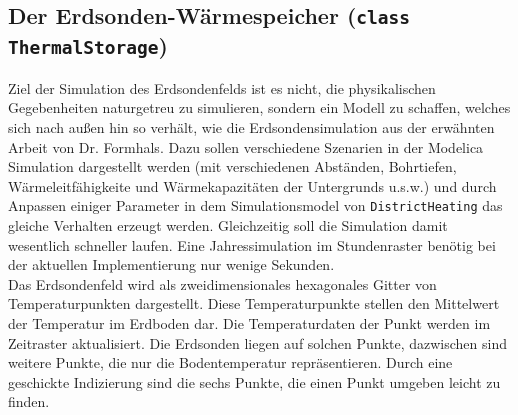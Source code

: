 \documentclass[12pt,a4paper]{article}
\begin{document}
\subsection{Der Erdsonden-Wärmespeicher (\texttt{class ThermalStorage})}
Ziel der Simulation des Erdsondenfelds ist es nicht, die physikalischen Gegebenheiten naturgetreu zu simulieren, sondern ein Modell zu schaffen, welches sich nach außen hin so verhält, wie die Erdsondensimulation aus der erwähnten Arbeit von Dr. Formhals. Dazu sollen verschiedene Szenarien in der Modelica Simulation dargestellt werden (mit verschiedenen Abständen, Bohrtiefen, Wärmeleitfähigkeite und Wärmekapazitäten der Untergrunds u.s.w.) und durch Anpassen einiger Parameter in dem Simulationsmodel von \texttt{DistrictHeating} das gleiche Verhalten erzeugt werden. Gleichzeitig soll die Simulation damit wesentlich schneller laufen. Eine Jahressimulation im Stundenraster benötig bei der aktuellen Implementierung nur wenige Sekunden.\\
Das Erdsondenfeld wird als zweidimensionales hexagonales Gitter von Temperaturpunkten dargestellt. Diese Temperaturpunkte stellen den Mittelwert der Temperatur im Erdboden dar. Die Temperaturdaten der Punkt werden im Zeitraster aktualisiert. Die Erdsonden liegen auf solchen Punkte, dazwischen sind weitere Punkte, die nur die Bodentemperatur repräsentieren. Durch eine geschickte Indizierung sind die sechs Punkte, die einen Punkt umgeben leicht zu finden.\\
\end{document}
